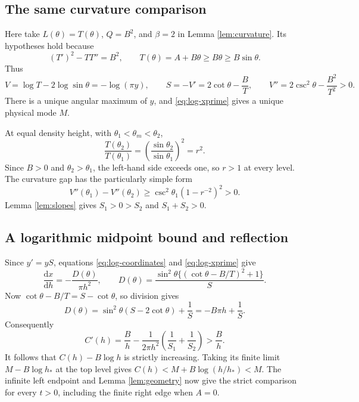 \documentclass[11pt,a4paper]{article}
\theoremstyle{definition}
\theoremstyle{remark}
\numberwithin{equation}{section}
\newcommand{\hp}{h_\ast}
\begin{document}
\subsection{The same curvature comparison}

Here take $L(\theta)=T(\theta)$, $Q=B^2$, and $\beta=2$ in
Lemma \ref{lem:curvature}. Its hypotheses hold because
\[
 (T')^2-TT''=B^2,\qquad
 T(\theta)=A+B\theta\ge B\theta\ge B\sin\theta .
\]
Thus
\begin{equation}\label{eq:log-VS}
 V=\log T-2\log\sin\theta=-\log(\pi y),\qquad
 S=-V'=2\cot\theta-\frac{B}{T},\qquad
 V''=2\csc^2\theta-\frac{B^2}{T^2}>0.
\end{equation}
There is a unique angular maximum of $y$, and
\eqref{eq:log-xprime} gives a unique physical mode $M$.

At equal density height, with
$\theta_1<\theta_m<\theta_2$,
\[
 \frac{T(\theta_2)}{T(\theta_1)}
 =\left(\frac{\sin\theta_2}{\sin\theta_1}\right)^2=r^2.
\]
Since $B>0$ and $\theta_2>\theta_1$, the left-hand side exceeds one,
so $r>1$ at every level. The curvature gap has the particularly
simple form
\begin{equation}\label{eq:log-gap}
 V''(\theta_1)-V''(\theta_2)
 \ge\csc^2\theta_1(1-r^{-2})^2>0.
\end{equation}
Lemma \ref{lem:slopes} gives $S_1>0>S_2$ and $S_1+S_2>0$.

\subsection{A logarithmic midpoint bound and reflection}

Since $y'=yS$, equations \eqref{eq:log-coordinates} and
\eqref{eq:log-xprime} give
\[
 \frac{\mathrm dx}{\mathrm dh}
 =-\frac{D(\theta)}{\pi h^2},\qquad
 D(\theta)=
 \frac{\sin^2\theta\{(\cot\theta-B/T)^2+1\}}{S}.
\]
Now $\cot\theta-B/T=S-\cot\theta$, so division gives
\begin{equation}\label{eq:log-D}
 D(\theta)
 =\sin^2\theta(S-2\cot\theta)+\frac1S
 =-B\pi h+\frac1S .
\end{equation}
Consequently
\begin{equation}\label{eq:log-ode}
 C'(h)
 =\frac Bh-\frac1{2\pi h^2}
          \left(\frac1{S_1}+\frac1{S_2}\right)
 >\frac Bh .
\end{equation}
It follows that $C(h)-B\log h$ is strictly increasing. Taking its
finite limit $M-B\log\hp$ at the top level gives
$C(h)<M+B\log(h/\hp)<M$. The infinite left endpoint and
Lemma \ref{lem:geometry} now give the strict comparison for every
$t>0$, including the finite right edge when $A=0$.
\end{document}
